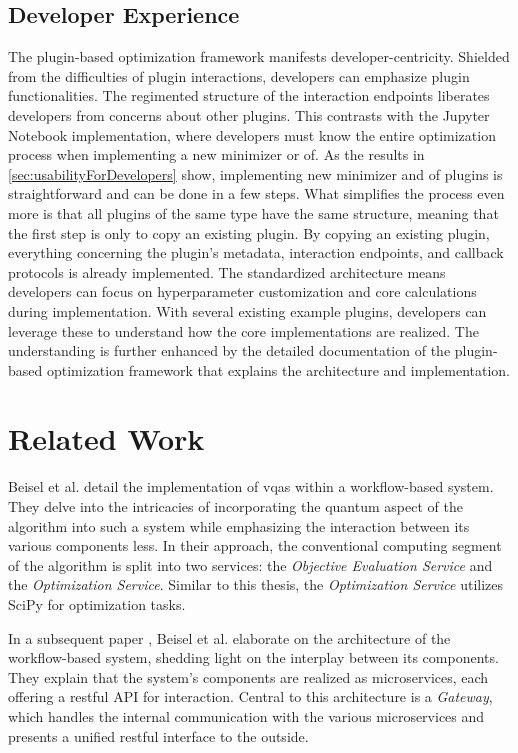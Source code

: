 \documentclass[
  a4paper,  %
  twoside,  %
  bibliography=totoc,
  headsepline,
  cleardoublepage=empty,
  parskip=half,
  draft=false
]{scrbook}
\begin{document}
\section{Developer Experience}
\label{sec:developerUsabilityAssessment}

The plugin-based optimization framework manifests developer-centricity.
Shielded from the difficulties of plugin interactions, developers can emphasize plugin functionalities.
The regimented structure of the interaction endpoints liberates developers from concerns about other plugins.
This contrasts with the Jupyter Notebook implementation, where developers must know the entire optimization process when implementing a new minimizer or \gls{of}.
As the results in \ref{sec:usabilityForDevelopers} show, implementing new minimizer and \gls{of} plugins is straightforward and can be done in a few steps.
What simplifies the process even more is that all plugins of the same type have the same structure, meaning that the first step is only to copy an existing plugin.
By copying an existing plugin, everything concerning the plugin's metadata, interaction endpoints, and callback protocols is already implemented.
The standardized architecture means developers can focus on hyperparameter customization and core calculations during implementation.
With several existing example plugins, developers can leverage these to understand how the core implementations are realized.
The understanding is further enhanced by the detailed documentation of the plugin-based optimization framework that explains the architecture and implementation.


\chapter{Related Work}
\label{chap:relatedWork}

Beisel et al. \cite{Beisel2023} detail the implementation of \glspl{vqa} within a workflow-based system.
They delve into the intricacies of incorporating the quantum aspect of the algorithm into such a system while emphasizing the interaction between its various components less.
In their approach, the conventional computing segment of the algorithm is split into two services: the \emph{Objective Evaluation Service} and the \emph{Optimization Service}.
Similar to this thesis, the \emph{Optimization Service} utilizes SciPy for optimization tasks.

In a subsequent paper \cite{Beisel2023a}, Beisel et al. elaborate on the architecture of the workflow-based system, shedding light on the interplay between its components.
They explain that the system's components are realized as microservices, each offering a \gls{rest}ful API for interaction.
Central to this architecture is a \emph{Gateway}, which handles the internal communication with the various microservices and presents a unified \gls{rest}ful interface to the outside.
\end{document}
